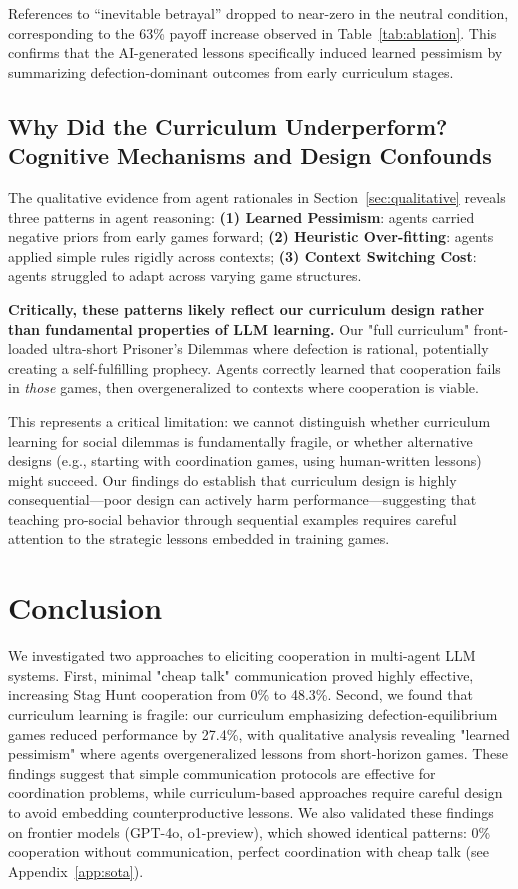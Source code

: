 \documentclass[11pt]{article}
\begin{document}
References to ``inevitable betrayal'' dropped to near-zero in the neutral condition, corresponding to the 63\% payoff increase observed in Table~\ref{tab:ablation}. This confirms that the AI-generated lessons specifically induced learned pessimism by summarizing defection-dominant outcomes from early curriculum stages.

\subsection{Why Did the Curriculum Underperform? Cognitive Mechanisms and Design Confounds}
\label{sec:failure_analysis}

The qualitative evidence from agent rationales in Section~\ref{sec:qualitative} reveals three patterns in agent reasoning: \textbf{(1) Learned Pessimism}: agents  carried negative priors from early games forward; \textbf{(2) Heuristic Over-fitting}: agents applied simple rules rigidly across contexts; \textbf{(3) Context Switching  Cost}: agents struggled to adapt across varying game structures. 

\textbf{Critically, these patterns likely reflect our curriculum design rather than fundamental properties of LLM learning.} Our "full curriculum" front-loaded ultra-short  Prisoner's Dilemmas where defection is rational, potentially creating a self-fulfilling  prophecy. Agents correctly learned that cooperation fails in \textit{those} games, then overgeneralized to contexts where cooperation is viable.

This represents a critical limitation: we cannot distinguish whether curriculum learning for social dilemmas is fundamentally fragile, or whether alternative designs (e.g., starting with coordination games, using human-written lessons) might succeed. Our findings do establish that curriculum design is highly consequential—poor design can actively harm performance—suggesting that teaching pro-social behavior through sequential examples requires careful attention to the strategic lessons embedded in training games.

\section{Conclusion}

We investigated two approaches to eliciting cooperation in multi-agent LLM systems. First, minimal "cheap talk" communication proved highly effective, increasing Stag Hunt cooperation from 0\% to 48.3\%. Second, we found that curriculum learning is fragile: our curriculum emphasizing defection-equilibrium games reduced performance by 27.4\%, with qualitative analysis revealing "learned pessimism" where agents overgeneralized lessons from short-horizon games. These findings suggest that simple communication protocols are effective for coordination problems, while curriculum-based approaches require careful design to avoid embedding counterproductive lessons. We also validated these findings on frontier models (GPT-4o, o1-preview), which showed identical patterns: 0\% cooperation without communication, perfect coordination with cheap talk (see Appendix~\ref{app:sota}).
\end{document}
